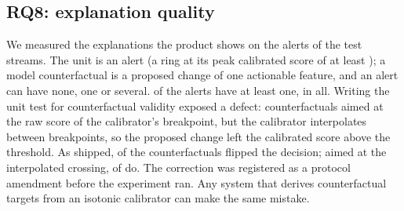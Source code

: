 \subsection{RQ8: explanation quality}
We measured the explanations the product shows on the \TwelveAlerts{} alerts of
the test streams. The unit is an alert (a ring at its peak calibrated score of
at least \TunedAlert{}); a model counterfactual is a proposed change of one
actionable feature, and an alert can have none, one or several.
\TwelveCfAlerts{} of the \TwelveAlerts{} alerts have at least one, \TwelveCfs{}
in all. Writing the unit test for counterfactual validity exposed a defect:
counterfactuals aimed at the raw score of the calibrator's breakpoint, but the
calibrator interpolates between breakpoints, so the proposed change left the
calibrated score above the threshold. As shipped, \TwelveValidAsShipped{} of
the \TwelveCfs{} counterfactuals flipped the decision; aimed at the
interpolated crossing, \TwelveValidCorrected{} of \TwelveCfs{} do. The
correction was registered as a protocol amendment before the experiment ran.
Any system that derives counterfactual targets from an isotonic calibrator can
make the same mistake.

